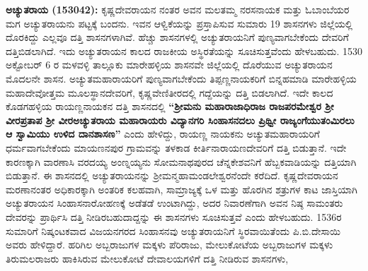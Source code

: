 \textbf{ಅಚ್ಯುತರಾಯ (1530\general{\enginline{-}}42):} ಕೃಷ್ಣದೇವರಾಯನ ನಂತರ ಅವನ ಮಲತಮ್ಮ ನರಸನಾಯಕ ಮತ್ತು ಓಬಾಂಬೆಯರ ಮಗ ಅಚ್ಯುತರಾಯನು ಪಟ್ಟಕ್ಕೆ ಬಂದನು. ಇವನ ಆಳ್ವಿಕೆಯನ್ನು ಪ್ರಸ್ತಾಪಿಸುವ ಸುಮಾರು 19 ಶಾಸನಗಳು ಜಿಲ್ಲೆಯಲ್ಲಿ ದೊರಕಿದ್ದು ಎಲ್ಲವೂ ದತ್ತಿ ಶಾಸನಗಳಾಗಿವೆ. ಹೆಚ್ಚು ಶಾಸನಗಳಲ್ಲಿ ಅಚ್ಯುತರಾಯನಿಗೆ ಪುಣ್ಯವಾಗಬೇಕೆಂದು ದೇವರಿಗೆ ದತ್ತಿಬಿಡಲಾಗಿದೆ. ಇದು ಅಚ್ಯುತರಾಯನ ಕಾಲದ ರಾಜಕೀಯ ಅಸ್ಥಿರತೆಯನ್ನು ಸೂಚಿಸುತ್ತವೆಂದು ಹೇಳಬಹುದು. 1530 ಅಕ್ಟೋಬರ್​ 6 ರ ಮಳವಳ್ಳಿ ತಾಲ್ಲೂಕು ಮಾರೇಹಳ್ಳಿಯ ಶಾಸನವೇ ಜಿಲ್ಲೆಯಲ್ಲಿ ದೊರೆಯುವ ಅಚ್ಯುತರಾಯನ ಮೊದಲನೇ ಶಾಸನ. ಅಚ್ಯುತಮಹಾರಾಯರಿಗೆ ಪುಣ್ಯವಾಗಬೇಕೆಂದು ತಿಪ್ಪಣ್ಣನಾಯಕರಿಗೆ ಬಿನ್ನಹಮಾಡಿ ಮಾರೇಹಳ್ಳಿಯ ಮಹಾದೇವೋತ್ತಮ ಮೂಲಸ್ಥಾನದೇವರಿಗೆ, ಕೃಷ್ಣವೇಣಿತೀರದಲ್ಲಿ ಗದ್ದೆಯನ್ನು ದತ್ತಿ ಬಿಡಲಾಗಿದೆ. ಇದೇ ಕಾಲದ ಕೊಡಗಹಳ್ಳಿಯ ರಾಯಣ್ಣನಾಯಕನ ದತ್ತಿ ಶಾಸನದಲ್ಲಿ \textbf{“ಶ‍್ರೀಮನು ಮಹಾರಾಜಾಧಿರಾಜ ರಾಜಪರಮೇಶ್ವರ ಶ‍್ರೀ ವೀರಪ್ರತಾಪ ಶ‍್ರೀ ವೀರಅಚ್ಯುತರಾಯ ಮಹಾರಾಯರು ವಿದ್ಯಾನಗರಿ ಸಿಂಹಾಸನದಲು ಪ್ರಿಥ್ವೀ ರಾಜ್ಯಂಗೆಯುತಂಮಿರಲು ಆ ಸ್ವಾಮಿಯು ಉಳಿದ ದಾನಶಾಸಣ”} ಎಂದು ಹೇಳಿದ್ದು, ರಾಯಣ್ಣ ನಾಯಕನು ಅಚ್ಯುತಮಹಾರಾಯರಿಗೆ ಧರ್ಮವಾಗಬೇಕೆಂದು ಮಾಯಣನಪುರ ಗ್ರಾಮವನ್ನು ತಳಕಾಡ ಕೀರ್ತಿನಾರಾಯಣದೇವರಿಗೆ ದತ್ತಿ ಬಿಡುತ್ತಾನೆ. ಇದೇ ಕಾರಣಕ್ಕಾಗಿ ವಾರಣಾಸಿ ವರದಯ್ಯ ಅಂಣ್ನಯ್ಯನು ಸೋಮನಾಥಪುರದ ಚೆನ್ನಕೇಶವನಿಗೆ ಹೆಬ್ಬಕವಾಡಿಯನ್ನು ದತ್ತಿಯಾಗಿ ಬಿಡುತ್ತಾನೆ. ಈ ಶಾಸನದಲ್ಲಿ ಅಚ್ಯುತರಾಯನನ್ನು ಶ‍್ರೀಮನ್ಮಹಾಮಂಡಲೇಶ್ವರನೆಂದೇ ಕರೆದಿದೆ. ಕೃಷ್ಣದೇವರಾಯನ ಮರಣಾನಂತರ ಅಧಿಕಾರಕ್ಕಾಗಿ ಅಂತರಿಕ ಕಲಹವಾಗಿ, ಸಾಮ್ರಾಜ್ಯಕ್ಕೆ ಒಳ ಮತ್ತು ಹೊರಗಿನ ಶತ್ರುಗಳ ಕಾಟ ಜಾಸ್ತಿಯಾಗಿ ಅಚ್ಯುತರಾಯನ ಸಿಂಹಾಸನಾರೋಹಣಕ್ಕೆ ಅಡೆತಡೆ ಉಂಟಾಗಿದ್ದು, ಅದರ ನಿವಾರಣೆಗಾಗಿ ಅವನ ನಿಷ್ಠ ಸಾಮಂತರು ದೇವರನ್ನು ಪ್ರಾರ್ಥಿಸಿ ದತ್ತಿ ನೀಡಿರಬಹುದಾದ್ದನ್ನು ಈ ಶಾಸನಗಳು ಸೂಚಿಸುತ್ತವೆ ಎಂದು ಹೇಳಬಹುದು. 1536ರ ಸುಮಾರಿಗೆ ನಿಷ್ಕಂಟಕವಾದ ವಿಜಯನಗರದ ಸಿಂಹಾಸನವು ಅಚ್ಯುತರಾಯನಿಗೆ ಸ್ಥಿರವಾಯಿತೆಂದು ಪಿ.ಬಿ.ದೇಸಾಯಿ ಅವರು ಹೇಳಿದ್ದಾರೆ. ಹರಿಗಿಲ ಅಬ್ಬರಾಜುಗಳ ಮಕ್ಕಳು ಪೆರಿರಾಜು, ಮೇಲುಕೋಟೆಯ ಅಬ್ಬರಾಜುಗಳ ಮಕ್ಕಳು ತಿರುಮಲರಾಜರು ಹಾಕಿಸಿರುವ ಮೇಲುಕೋಟೆ ದೇವಾಲಯಗಳಿಗೆ ದತ್ತಿ ನೀಡಿರುವ ಶಾಸನಗಳು,
